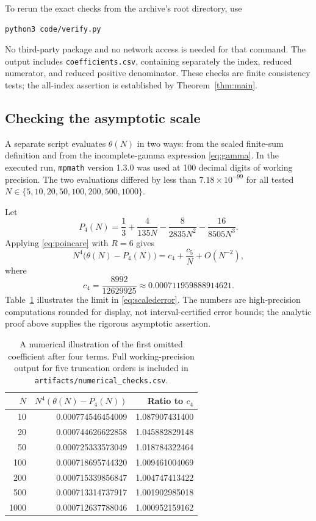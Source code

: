 \documentclass[11pt,letterpaper]{article}
\numberwithin{equation}{section}
\theoremstyle{remark}
\begin{document}
To rerun the exact checks from the archive's root directory, use
\begin{lstlisting}[language=bash]
python3 code/verify.py
\end{lstlisting}
No third-party package and no network access is needed for that command.
The output includes \texttt{coefficients.csv}, containing separately the
index, reduced numerator, and reduced positive denominator. These checks
are finite consistency tests; the all-index assertion is established by
Theorem~\ref{thm:main}.

\subsection{Checking the asymptotic scale}

A separate script evaluates $\theta(N)$ in two ways: from the scaled
finite-sum definition and from the incomplete-gamma expression
\eqref{eq:gamma}. In the executed run, \texttt{mpmath} version 1.3.0 was used
at 100 decimal digits of working precision. The two evaluations differed
by less than $7.18\times10^{-99}$ for all tested
$N\in\{5,10,20,50,100,200,500,1000\}$.

Let
\[
 P_4(N)=\frac13+\frac4{135N}-\frac8{2835N^2}
                    -\frac{16}{8505N^3}.
\]
Applying \eqref{eq:poincare} with $R=6$ gives
\begin{equation}
 N^4\bigl(\theta(N)-P_4(N)\bigr)
 =c_4+\frac{c_5}{N}+O(N^{-2}),
 \label{eq:scalederror}
\end{equation}
where
\[
 c_4=\frac{8992}{12629925}\approx0.000711959888914621.
\]
Table~\ref{tab:numerical} illustrates the limit in
\eqref{eq:scalederror}. The numbers are high-precision computations rounded
for display, not interval-certified error bounds; the analytic proof
above supplies the rigorous asymptotic assertion.

\begin{table}[htbp]
\centering
\begin{tabular}{r r r}
\toprule
$N$ & $N^4(\theta(N)-P_4(N))$ & Ratio to $c_4$\\
\midrule
10   & 0.000774546454009 & 1.087907431400\\
20   & 0.000744626622858 & 1.045882829148\\
50   & 0.000725333573049 & 1.018784322464\\
100  & 0.000718695744320 & 1.009461004069\\
200  & 0.000715339856847 & 1.004747413422\\
500  & 0.000713314737917 & 1.001902985018\\
1000 & 0.000712637788046 & 1.000952159162\\
\bottomrule
\end{tabular}
\caption{A numerical illustration of the first omitted coefficient after
four terms. Full working-precision output for five truncation orders is
included in \texttt{artifacts/numerical\_checks.csv}.}
\label{tab:numerical}
\end{table}
\end{document}
